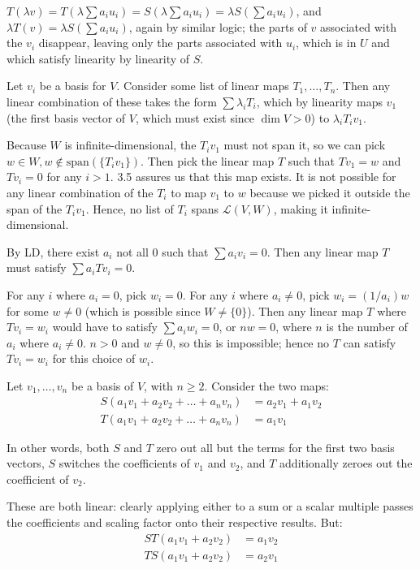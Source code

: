 \documentclass{article}
\begin{document}
$T(\lambda v) = T(\lambda \sum a_iu_i) = S(\lambda \sum a_iu_i) = \lambda S(\sum
a_iu_i)$, and $\lambda T(v) = \lambda S(\sum a_iu_i)$, again by similar logic;
the parts of $v$ associated with the $v_i$ disappear, leaving only the parts
associated with $u_i$, which is in $U$ and which satisfy linearity by linearity
of $S$.


Let $v_i$ be a basis for $V$. Consider some list of linear maps $T_1, \ldots,
T_n$. Then any linear combination of these takes the form $\sum \lambda_i T_i$,
which by linearity maps $v_1$ (the first basis vector of $V$, which must exist
since $\dim V > 0$) to $\lambda_i T_iv_1$.

Because $W$ is infinite-dimensional, the $T_iv_1$ must not span it, so we can
pick $w \in W, w \notin \text{span}(\{T_iv_1\})$. Then pick the linear map $T$
such that $Tv_1 = w$ and $Tv_i = 0$ for any $i > 1$. 3.5 assures us that this
map exists. It is not possible for any linear combination of the $T_i$ to map
$v_1$ to $w$ because we picked it outside the span of the $T_iv_1$. Hence, no
list of $T_i$ spans $\mathcal{L}(V,W)$, making it infinite-dimensional.


By LD, there exist $a_i$ not all 0 such that $\sum a_iv_i = 0$. Then any linear
map $T$ must satisfy $\sum a_iTv_i = 0$.

For any $i$ where $a_i = 0$, pick $w_i = 0$. For any $i$ where $a_i \neq 0$,
pick $w_i = (1/a_i)w$ for some $w \neq 0$ (which is possible since $W \neq
\{0\}$). Then any linear map $T$ where $Tv_i = w_i$ would have to satisfy $\sum
a_iw_i = 0$, or $nw = 0$, where $n$ is the number of $a_i$ where $a_i \neq 0$.
$n > 0$ and $w \neq 0$, so this is impossible; hence no $T$ can satisfy $Tv_i =
w_i$ for this choice of $w_i$.


Let $v_1, \ldots, v_n$ be a basis of $V$, with $n \geq 2$. Consider the two
maps:
\begin{align*}
  S(a_1v_1 + a_2v_2 + \ldots + a_nv_n) & = a_2v_1 + a_1v_2 \\
  T(a_1v_1 + a_2v_2 + \ldots + a_nv_n) & = a_1v_1
\end{align*}

In other words, both $S$ and $T$ zero out all but the terms for the first two
basis vectors, $S$ switches the coefficients of $v_1$ and $v_2$, and $T$
additionally zeroes out the coefficient of $v_2$.

These are both linear: clearly applying either to a sum or a scalar multiple
passes the coefficients and scaling factor onto their respective results. But:
\begin{align*}
  ST(a_1v_1 + a_2v_2) & = a_1v_2 \\
  TS(a_1v_1 + a_2v_2) & = a_2v_1
\end{align*}
\end{document}
